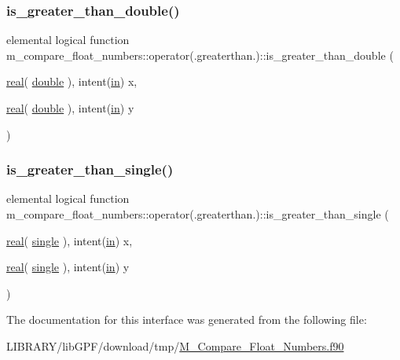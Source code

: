 \subsubsection{\texorpdfstring{is\+\_\+greater\+\_\+than\+\_\+double()}{is\_greater\_than\_double()}}
{\footnotesize\ttfamily elemental logical function m\+\_\+compare\+\_\+float\+\_\+numbers\+::operator(.greaterthan.)\+::is\+\_\+greater\+\_\+than\+\_\+double (\begin{DoxyParamCaption}\item[{\hyperlink{read__watch_83_8txt_abdb62bde002f38ef75f810d3a905a823}{real}( \hyperlink{namespacem__compare__float__numbers_af4b789cd6e1a2abcd412eaf29e91ea0c}{double} ), intent(\hyperlink{M__journal_83_8txt_afce72651d1eed785a2132bee863b2f38}{in})}]{x,  }\item[{\hyperlink{read__watch_83_8txt_abdb62bde002f38ef75f810d3a905a823}{real}( \hyperlink{namespacem__compare__float__numbers_af4b789cd6e1a2abcd412eaf29e91ea0c}{double} ), intent(\hyperlink{M__journal_83_8txt_afce72651d1eed785a2132bee863b2f38}{in})}]{y }\end{DoxyParamCaption})\hspace{0.3cm}{\ttfamily [private]}}

\mbox{\label{interfacem__compare__float__numbers_1_1operator_07_8greaterthan_8_08_a74731f139702271cff240069818d8127}} 
\subsubsection{\texorpdfstring{is\+\_\+greater\+\_\+than\+\_\+single()}{is\_greater\_than\_single()}}
{\footnotesize\ttfamily elemental logical function m\+\_\+compare\+\_\+float\+\_\+numbers\+::operator(.greaterthan.)\+::is\+\_\+greater\+\_\+than\+\_\+single (\begin{DoxyParamCaption}\item[{\hyperlink{read__watch_83_8txt_abdb62bde002f38ef75f810d3a905a823}{real}( \hyperlink{namespacem__compare__float__numbers_a5f122d46d6ad7d1cf0b899d9c855c498}{single} ), intent(\hyperlink{M__journal_83_8txt_afce72651d1eed785a2132bee863b2f38}{in})}]{x,  }\item[{\hyperlink{read__watch_83_8txt_abdb62bde002f38ef75f810d3a905a823}{real}( \hyperlink{namespacem__compare__float__numbers_a5f122d46d6ad7d1cf0b899d9c855c498}{single} ), intent(\hyperlink{M__journal_83_8txt_afce72651d1eed785a2132bee863b2f38}{in})}]{y }\end{DoxyParamCaption})\hspace{0.3cm}{\ttfamily [private]}}



The documentation for this interface was generated from the following file\+:\begin{DoxyCompactItemize}
\item 
L\+I\+B\+R\+A\+R\+Y/lib\+G\+P\+F/download/tmp/\hyperlink{M__Compare__Float__Numbers_8f90}{M\+\_\+\+Compare\+\_\+\+Float\+\_\+\+Numbers.\+f90}\end{DoxyCompactItemize}
